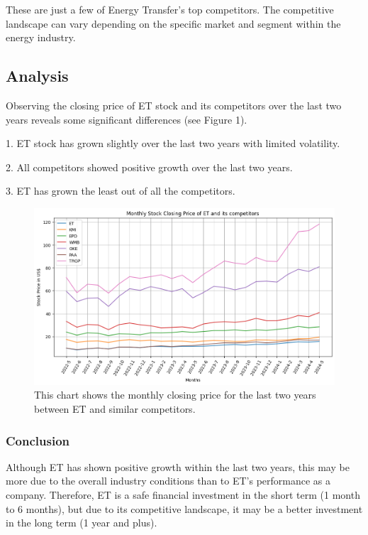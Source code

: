 \documentclass[9pt,a4paper,twoside]{tau}
\begin{document}
    These are just a few of Energy Transfer's top competitors. The competitive landscape can vary depending on the specific market and segment within the energy industry.

    \subsection{Analysis}
    
        Observing the closing price of ET stock and its competitors over the last two years reveals some significant differences (see Figure 1). 
    
        1. ET stock has grown slightly over the last two years with limited volatility.

        2. All competitors showed positive growth over the last two years.

        3. ET has grown the least out of all the competitors.

        
        \begin{figure}[H]
            \centering
            \includegraphics[width=0.85\columnwidth]{Figures/MonthlyStockClosingPrices.png}
            \caption{This chart shows the monthly closing price for the last two years between ET and similar competitors\cite{yahoo-finance-2024}.}
            \label{fig:figure}
        \end{figure}
        
        \subsubsection{Conclusion}
        
            Although ET has shown positive growth within the last two years, this may be more due to the overall industry conditions than to ET's performance as a company. Therefore, ET is a safe financial investment in the short term (1 month to 6 months), but due to its competitive landscape, it may be a better investment in the long term (1 year and plus).
\end{document}
